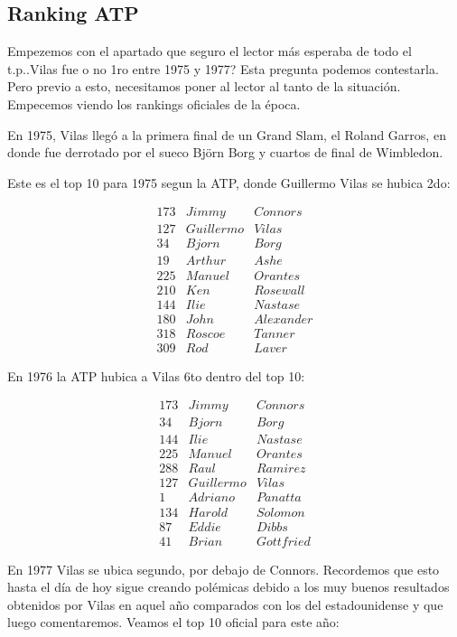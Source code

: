 \subsection{Ranking ATP}

Empezemos con el apartado que seguro el lector más esperaba de todo el t.p..Vilas fue o no 1ro entre 1975 y 1977? Esta pregunta podemos contestarla. Pero previo a esto, necesitamos poner al lector al tanto de la situación. Empecemos viendo los rankings oficiales de la época.


En 1975, Vilas llegó a la primera final de un Grand Slam, el Roland Garros, en donde fue derrotado por el sueco Björn Borg
y cuartos de final de Wimbledon.


Este es el top 10 para 1975 segun la ATP, donde Guillermo Vilas se hubica 2do:

\begin{eqnarray*}
173 & Jimmy & Connors \\
127 & Guillermo & Vilas \\
34 & Bjorn & Borg \\
19 & Arthur & Ashe \\
225 & Manuel & Orantes \\
210 & Ken & Rosewall \\
144 & Ilie & Nastase \\
180 & John & Alexander \\
318 & Roscoe & Tanner \\
309 & Rod & Laver 
\end{eqnarray*}

En 1976 la ATP hubica a Vilas 6to dentro del top 10:

\begin{eqnarray*}
173 & Jimmy & Connors \\
34 & Bjorn & Borg \\
144 & Ilie & Nastase \\
225 & Manuel & Orantes \\
288 & Raul & Ramirez \\
127 & Guillermo & Vilas \\
1 & Adriano & Panatta \\
134 & Harold & Solomon \\
87 & Eddie & Dibbs \\
41 & Brian & Gottfried 
\end{eqnarray*}

En 1977 Vilas se ubica segundo, por debajo de Connors. Recordemos que esto hasta el día de hoy sigue creando polémicas debido a los muy buenos resultados obtenidos por Vilas en aquel año comparados con los del estadounidense y que luego comentaremos.
Veamos el top 10 oficial para este año:

